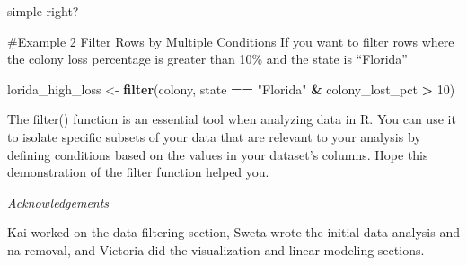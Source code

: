 \documentclass[
]{article}
\newenvironment{Shaded}{\begin{snugshade}}{\end{snugshade}}
\newcommand{\DecValTok}[1]{\textcolor[rgb]{0.00,0.00,0.81}{#1}}
\newcommand{\FunctionTok}[1]{\textcolor[rgb]{0.13,0.29,0.53}{\textbf{#1}}}
\newcommand{\NormalTok}[1]{#1}
\newcommand{\OtherTok}[1]{\textcolor[rgb]{0.56,0.35,0.01}{#1}}
\newcommand{\SpecialCharTok}[1]{\textcolor[rgb]{0.81,0.36,0.00}{\textbf{#1}}}
\newcommand{\StringTok}[1]{\textcolor[rgb]{0.31,0.60,0.02}{#1}}
\begin{document}
simple right?

\#Example 2 Filter Rows by Multiple Conditions If you want to filter
rows where the colony loss percentage is greater than 10\% and the state
is ``Florida''

\begin{Shaded}
\begin{Highlighting}[]
\NormalTok{lorida\_high\_loss }\OtherTok{\textless{}{-}} \FunctionTok{filter}\NormalTok{(colony, state }\SpecialCharTok{==} \StringTok{"Florida"} \SpecialCharTok{\&}\NormalTok{ colony\_lost\_pct }\SpecialCharTok{\textgreater{}} \DecValTok{10}\NormalTok{)}
\end{Highlighting}
\end{Shaded}

The filter() function is an essential tool when analyzing data in R. You
can use it to isolate specific subsets of your data that are relevant to
your analysis by defining conditions based on the values in your
dataset's columns. Hope this demonstration of the filter function helped
you.

\emph{Acknowledgements}

Kai worked on the data filtering section, Sweta wrote the initial data
analysis and na removal, and Victoria did the visualization and linear
modeling sections.
\end{document}
